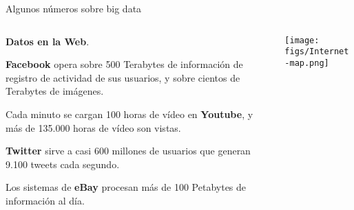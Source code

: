\begin{frame}{Algunos números sobre big data}
 \begin{columns}[T]
    \begin{column}{.7\textwidth}
    \begin{wideitemize}
     \item \textbf{Datos en la Web}.
     \item \textbf{Facebook} opera sobre 500 Terabytes de información de registro de actividad
     de sus usuarios, y sobre cientos de Terabytes de imágenes.
     \item Cada minuto se cargan 100 horas de vídeo en \textbf{Youtube}, y más de 135.000
     horas de vídeo son vistas.
     \item \textbf{Twitter} sirve a casi 600 millones de usuarios que generan 9.100 tweets
     cada segundo.
     \item Los sistemas de \textbf{eBay} procesan más de 100 Petabytes de información al día.

    \end{wideitemize}

    \end{column}
    \begin{column}{.3\textwidth}
    \vspace*{2cm}
    \hspace*{-0.5cm}
    \texttt{[image: figs/Internet-map.png]}
    \end{column}
  \end{columns}

\end{frame}


